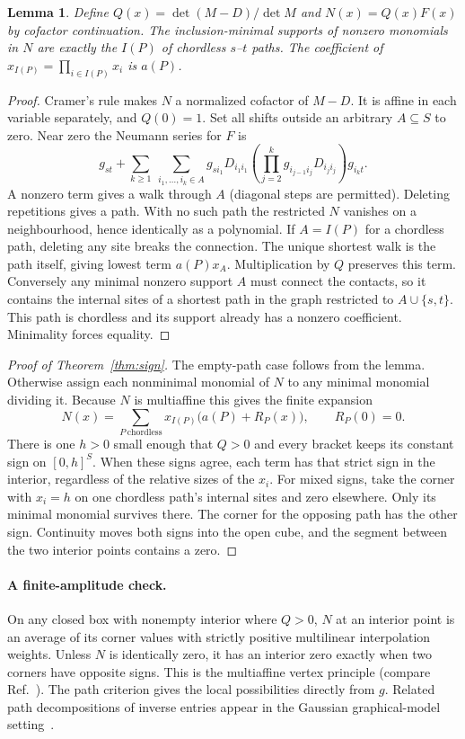 \documentclass[11pt,a4paper]{article}
\newtheorem{lemma}[theorem]{Lemma}
\begin{document}
\begin{lemma}\label{lem:monomials}
Define $Q(x)=\det(M-D)/\det M$ and $N(x)=Q(x)F(x)$ by cofactor continuation. The inclusion-minimal supports of nonzero monomials in $N$ are exactly the $I(P)$ of chordless $s$--$t$ paths. The coefficient of $x_{I(P)}=\prod_{i\in I(P)}x_i$ is $a(P)$.
\end{lemma}
\begin{proof}
Cramer's rule makes $N$ a normalized cofactor of $M-D$. It is affine in each variable separately, and $Q(0)=1$. Set all shifts outside an arbitrary $A\subseteq S$ to zero. Near zero the Neumann series for $F$ is
\[
 g_{st}+\sum_{k\ge1}\ \sum_{i_1,\ldots,i_k\in A}
       g_{s i_1}D_{i_1 i_1}\left(\prod_{j=2}^k g_{i_{j-1} i_j}D_{i_j i_j}\right)g_{i_k t}.
\]
A nonzero term gives a walk through $A$ (diagonal steps are permitted). Deleting repetitions gives a path. With no such path the restricted $N$ vanishes on a neighbourhood, hence identically as a polynomial. If $A=I(P)$ for a chordless path, deleting any site breaks the connection. The unique shortest walk is the path itself, giving lowest term $a(P)x_A$. Multiplication by $Q$ preserves this term. Conversely any minimal nonzero support $A$ must connect the contacts, so it contains the internal sites of a shortest path in the graph restricted to $A\cup\{s,t\}$. This path is chordless and its support already has a nonzero coefficient. Minimality forces equality.
\end{proof}

\begin{proof}[Proof of Theorem~\ref{thm:sign}]
The empty-path case follows from the lemma. Otherwise assign each nonminimal monomial of $N$ to any minimal monomial dividing it. Because $N$ is multiaffine this gives the finite expansion
\[
 N(x)=\sum_{P\ \mathrm{chordless}} x_{I(P)}\big(a(P)+R_P(x)\big),\qquad R_P(0)=0.
\]
There is one $h>0$ small enough that $Q>0$ and every bracket keeps its constant sign on $[0,h]^S$. When these signs agree, each term has that strict sign in the interior, regardless of the relative sizes of the $x_i$. For mixed signs, take the corner with $x_i=h$ on one chordless path's internal sites and zero elsewhere. Only its minimal monomial survives there. The corner for the opposing path has the other sign. Continuity moves both signs into the open cube, and the segment between the two interior points contains a zero.
\end{proof}

\paragraph{A finite-amplitude check.}
On any closed box with nonempty interior where $Q>0$, $N$ at an interior point is an average of its corner values with strictly positive multilinear interpolation weights. Unless $N$ is identically zero, it has an interior zero exactly when two corners have opposite signs. This is the multiaffine vertex principle (compare Ref.~\cite{vertex}). The path criterion gives the local possibilities directly from $g$. Related path decompositions of inverse entries appear in the Gaussian graphical-model setting~\cite{jones}.
\end{document}
